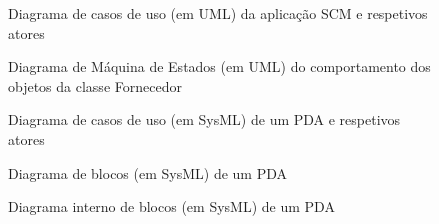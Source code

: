\documentclass[12pt,a4paper]{article}
\begin{document}
\begin{landscape}
  \begin{figure}
    \centering
    
    \caption{Diagrama de casos de uso (em UML) da aplicação SCM e respetivos atores}
    \label{fig:uml1}
  \end{figure}
\end{landscape}

%     

\begin{landscape}
  \begin{figure}
    \centering
    
    \caption{Diagrama de Máquina de Estados (em UML) do comportamento dos objetos da classe Fornecedor}
    \label{fig:uml3}
  \end{figure}
\end{landscape}

\begin{landscape}
  \begin{figure}
    \centering
    
    \caption{Diagrama de casos de uso (em SysML) de um PDA e respetivos atores}
    \label{fig:sysml1}
  \end{figure}
\end{landscape}

\begin{landscape}
  \begin{figure}
    \centering
    
    \caption{Diagrama de blocos (em SysML) de um PDA}
    \label{fig:sysml2}
  \end{figure}
\end{landscape}

\begin{landscape}
  \begin{figure}
    \centering
    
    \caption{Diagrama interno de blocos (em SysML) de um PDA}
    \label{fig:sysml3}
  \end{figure}
\end{landscape}
\end{document}
